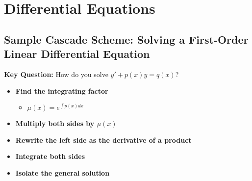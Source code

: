 \section{Differential Equations}

\subsection*{Sample Cascade Scheme: Solving a First-Order Linear Differential Equation}

\begin{cascade}
	\textbf{Key Question:} How do you solve $y' + p(x)y = q(x)$?
	\begin{itemize}
		\item \textbf{Find the integrating factor}
		      \begin{itemize}
			      \item $\mu(x) = e^{\int p(x) dx}$
		      \end{itemize}
		\item \textbf{Multiply both sides by $\mu(x)$}
		\item \textbf{Rewrite the left side as the derivative of a product}
		\item \textbf{Integrate both sides}
		\item \textbf{Isolate the general solution}
	\end{itemize}
\end{cascade}

